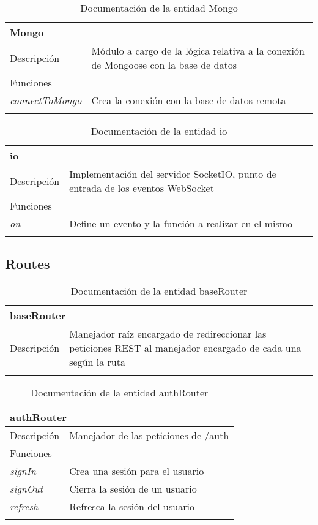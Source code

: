 \begin{longtable}{|p{} p{}|}
    \hline
    \multicolumn{2}{|l|}{\textbf{Mongo}} \\ \hline \hline
    Descripción      & Módulo a cargo de la lógica relativa a la conexión de Mongoose con la base de datos \\ \hline
    \multicolumn{2}{|l|}{Funciones} \\
    \emph{connectToMongo}  & Crea la conexión con la base de datos remota  \\ \hline
    \caption{Documentación de la entidad Mongo}
    \label{dis:api:mongo}
\end{longtable}

\begin{longtable}{|p{} p{}|}
    \hline
    \multicolumn{2}{|l|}{\textbf{io}} \\ \hline \hline
    Descripción      & Implementación del servidor SocketIO, punto de entrada de los eventos WebSocket \\ \hline
    \multicolumn{2}{|l|}{Funciones} \\
    \emph{on}  & Define un evento y la función a realizar en el mismo  \\ \hline
    \caption{Documentación de la entidad io}
    \label{dis:api:io}
\end{longtable}

\subsection{Routes}

\begin{longtable}{|p{} p{}|}
    \hline
    \multicolumn{2}{|l|}{\textbf{baseRouter}} \\ \hline \hline
    Descripción      & Manejador raíz encargado de redireccionar las peticiones REST al manejador encargado de cada una según la ruta \\ \hline
    \caption{Documentación de la entidad baseRouter}
    \label{dis:api:base_router}
\end{longtable}

\begin{longtable}{|p{} p{}|}
    \hline
    \multicolumn{2}{|l|}{\textbf{authRouter}} \\ \hline \hline
    Descripción      & Manejador de las peticiones de /auth \\ \hline
    \multicolumn{2}{|l|}{Funciones} \\
    \emph{signIn}  & Crea una sesión para el usuario  \\ 
    \emph{signOut}  & Cierra la sesión de un usuario  \\ 
    \emph{refresh}  & Refresca la sesión del usuario  \\ \hline
    \caption{Documentación de la entidad authRouter}
    \label{dis:api:auth_router}
\end{longtable}

